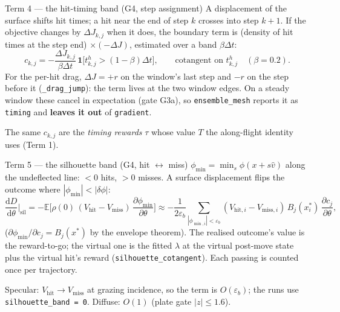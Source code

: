 \documentclass[10pt,aspectratio=169]{beamer}
\newcommand{\E}{\mathbb{E}}
\newcommand{\ind}{\mathbf{1}}
\newcommand{\dd}{\mathrm{d}}
\newcommand{\code}[1]{\texttt{\small #1}}
\begin{document}
\begin{frame}{Term 4 --- the hit-timing band (G4, step assignment)}
A displacement of the surface shifts hit times; a hit near the end of step $k$ crosses into
step $k+1$.  If the objective changes by $\Delta J_{k,j}$ when it does, the boundary term is
(density of hit times at the step end) $\times(-\Delta J)$, estimated over a band
$\beta\Delta t$:
\[
c_{k,j} = -\frac{\Delta J_{k,j}}{\beta\Delta t}\,\ind\big[t^h_{k,j} > (1-\beta)\Delta t\big],
\qquad\text{cotangent on } t^h_{k,j}\quad(\beta = 0.2).
\]
For the per-hit drag, $\Delta J = +r$ on the window's last step and $-r$ on the step
before it (\code{\_drag\_jump}): the term lives at the two window edges.  On a steady
window these cancel in expectation (gate G3a), so \code{ensemble\_mesh} reports it as
\code{timing} and \textbf{leaves it out} of \code{gradient}.

\medskip
The same $c_{k,j}$ are the \emph{timing rewards} $\tau$ whose value $T$ the along-flight
identity uses (Term 1).
\end{frame}

\begin{frame}{Term 5 --- the silhouette band (G4, hit $\leftrightarrow$ miss)}
$\phi_{\min} = \min_s\phi(x + s\hat v)$ along the undeflected line: $<0$ hits, $>0$ misses.  A
surface displacement flips the outcome where $|\phi_{\min}| < |\delta\phi|$:
\[
\frac{\dd D}{\dd\theta}\Big|_{\mathrm{sil}} = -\E\Big[\rho(0)\,(V_{\mathrm{hit}} - V_{\mathrm{miss}})\,\frac{\partial\phi_{\min}}{\partial\theta}\Big]
\approx -\frac{1}{2\varepsilon_b}\sum_{|\phi_{\min,i}|<\varepsilon_b}(V_{\mathrm{hit},i} - V_{\mathrm{miss},i})\,B_j(x^*_i)\,\frac{\partial c_j}{\partial\theta},
\]
($\partial\phi_{\min}/\partial c_j = B_j(x^*)$ by the envelope theorem).  The realised outcome's value is the reward-to-go; the
virtual one is the fitted $\lambda$ at the virtual post-move state plus the virtual hit's
reward (\code{silhouette\_cotangent}).  Each passing is counted once per trajectory.

\medskip
Specular: $V_{\mathrm{hit}}\to V_{\mathrm{miss}}$ at grazing incidence, so the term is $O(\varepsilon_b)$; the runs
use \code{silhouette\_band = 0}.  Diffuse: $O(1)$ (plate gate $|z|\le1.6$).
\end{frame}
\end{document}
